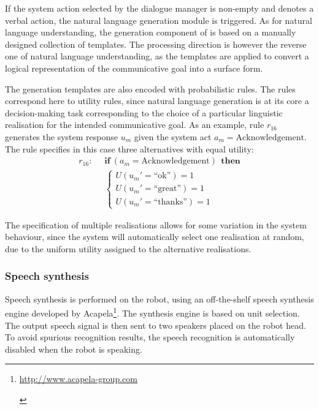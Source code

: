 If the system action selected by the dialogue manager is non-empty and denotes a verbal action, the natural language generation module is triggered.  As for natural language understanding, the generation component of \opendial{} is based on a manually designed collection of templates.  The processing direction is however the reverse one of  natural language understanding, as the templates are applied to convert a logical representation of the communicative goal into a surface form. 

The generation templates are also encoded with probabilistic rules.  The rules correspond here to utility rules, since natural language generation is at its core a decision-making task corresponding to the choice of a particular linguistic realisation for the intended communicative goal.  As an example, rule $r_{16}$ generates the system response $u_m$ given the system act $a_m=\mathrm{Acknowledgement}$.  The rule specifies in this case three alternatives with equal utility:
\begin{align*}
r_{16}: &\;\;\textbf{if} \ (a_m = \mathrm{Acknowledgement} )  \ \ \textbf{then} \\ 
& \;\; \begin{cases} U(u_m'=\text{``ok''}) = 1 \\ U(u_m'=\text{``great''}) = 1 \\ U(u_m'=\text{``thanks''}) = 1 \end{cases}
\end{align*}

The specification of multiple realisations allows for some variation in the system behaviour, since the system will automatically select one realisation at random, due to the uniform utility assigned to the alternative realisations.

\subsubsection*{Speech synthesis}

Speech synthesis is performed on the robot, using an off-the-shelf speech synthesis engine developed by Acapela\footnote{\begin{scriptsize}\url{http://www.acapela-group.com}\end{scriptsize}}. The synthesis engine is based on unit selection. The output speech signal is then sent to two speakers placed on the robot head. To avoid spurious recognition results, the speech recognition is automatically disabled when the robot is speaking.   
 
